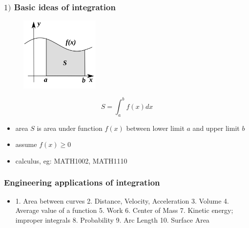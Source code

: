 \documentclass[english,14pt]{beamer}
\begin{document}
\begin{frame}[fragile]

\frametitle{$1)$ Basic ideas of integration}

\vspace*{-5mm}
\begin{figure}[ht]
	\centering
	\includegraphics[width=0.35\textwidth]{figures/integralArea}
\end{figure}
\vspace*{-5mm}
\[
S = \int_a^b f(x) dx
\]
\vspace*{-5mm}
\begin{itemize}
	\item area $S$ is area under function $f(x)$ between lower limit $a$ and upper limit $b$
	\item assume $f(x) \geq 0$
	\item calculus, eg: MATH1002, MATH1110
\end{itemize}

\end{frame}


\begin{frame}[fragile]

\frametitle{Engineering applications of integration}


\begin{itemize}
	\item 1. Area between curves
2. Distance, Velocity, Acceleration
3. Volume
4. Average value of a function
5. Work
6. Center of Mass
7. Kinetic energy; improper integrals
8. Probability
9. Arc Length
10. Surface Area
\end{itemize}

\end{frame}

\end{document}
